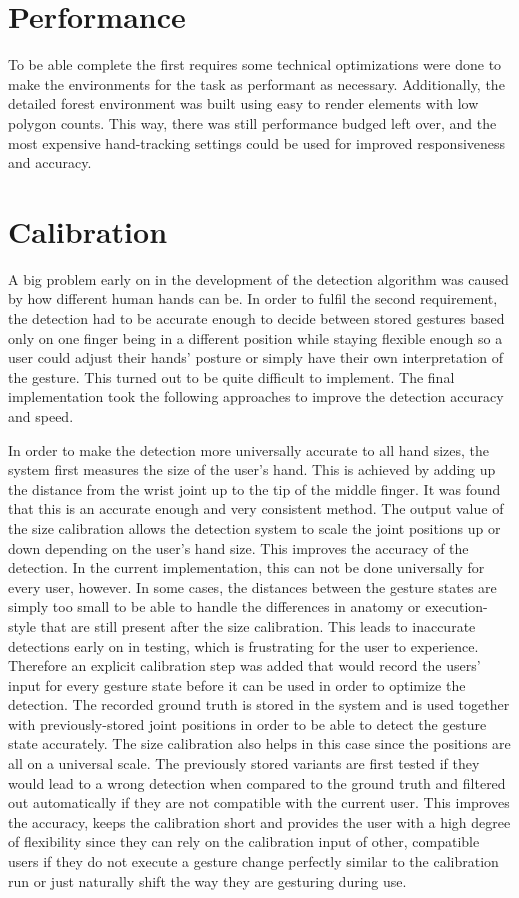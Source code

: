 \section{Performance}
To be able complete the first requires some technical optimizations were done to make the environments for the task as performant as necessary. Additionally, the detailed forest environment was built using easy to render elements with low polygon counts. This way, there was still performance budged left over, and the most expensive hand-tracking settings could be used for improved responsiveness and accuracy.

\section{Calibration}
A big problem early on in the development of the detection algorithm was caused by how different human hands can be. In order to fulfil the second requirement, the detection had to be accurate enough to decide between stored gestures based only on one finger being in a different position while staying flexible enough so a user could adjust their hands' posture or simply have their own interpretation of the gesture. This turned out to be quite difficult to implement. The final implementation took the following approaches to improve the detection accuracy and speed.

In order to make the detection more universally accurate to all hand sizes, the system first measures the size of the user's hand. This is achieved by adding up the distance from the wrist joint up to the tip of the middle finger. It was found that this is an accurate enough and very consistent method. The output value of the size calibration allows the detection system to scale the joint positions up or down depending on the user's hand size. This improves the accuracy of the detection. In the current implementation, this can not be done universally for every user, however. In some cases, the distances between the gesture states are simply too small to be able to handle the differences in anatomy or execution-style that are still present after the size calibration. This leads to inaccurate detections early on in testing, which is frustrating for the user to experience. Therefore an explicit calibration step was added that would record the users' input for every gesture state before it can be used in order to optimize the detection. The recorded ground truth is stored in the system and is used together with previously-stored joint positions in order to be able to detect the gesture state accurately. The size calibration also helps in this case since the positions are all on a universal scale. The previously stored variants are first tested if they would lead to a wrong detection when compared to the ground truth and filtered out automatically if they are not compatible with the current user. This improves the accuracy, keeps the calibration short and provides the user with a high degree of flexibility since they can rely on the calibration input of other, compatible users if they do not execute a gesture change perfectly similar to the calibration run or just naturally shift the way they are gesturing during use.

